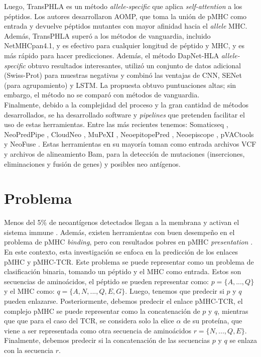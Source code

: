 \documentclass[a4paper]{article}
\begin{document}
Luego, TransPHLA \citep{chu2022transformer} es un método \textit{allele-specific} que aplica \textit{self-attention} a los péptidos. Los autores desarrollaron AOMP, que toma la unión de pMHC como entrada y devuelve péptidos mutantes con mayor afinidad hacia el \textit{allele} MHC. Además, TransPHLA superó a los métodos de vanguardia, incluido NetMHCpan4.1, y es efectivo para cualquier longitud de péptido y MHC, y es más rápido para hacer predicciones. Además, el método DapNet-HLA \textit{allele-specific} \citep{jing2023dapnet} obtuvo resultados interesantes, utilizó un conjunto de datos adicional (Swiss-Prot) para muestras negativas y combinó las ventajas de CNN, SENet (para agrupamiento) y LSTM. La propuesta obtuvo puntuaciones altas; sin embargo, el método no se comparó con métodos de vanguardia.\\


Finalmente, debido a la complejidad del proceso y la gran cantidad de métodos desarrollados, se ha desarrollado software y \textit{pipelines} que pretenden facilitar el uso de estas herramientas. Entre las más recientes tenemos: Somaticseq \citep{fang2015ensemble}, NeoPredPipe \citep{schenck2019neopredpipe}, CloudNeo \citep{bais2017cloudneo}, MuPeXI \citep{bjerregaard2017mupexi}, NeoepitopePred \citep{tran2015immunogenicity}, Neoepiscope \citep{yossef2018enhanced}, pVACtools \citep{hundal2020pvactools}  y NeoFuse \citep{gros2016prospective}. Estas herramientas en su mayoría toman como entrada archivos VCF y archivos de alineamiento Bam, para la detección de mutaciones (inserciones, eliminaciones y fusión de genes) y posibles neo antígenos. 




\section{Problema}

Menos del 5\% de neoantígenos detectados llegan a la membrana y activan el sistema immune \citep{de2020neoantigen, mill2022neoms, bulik2019deep, bassani2015mass, yadav2014predicting}. Además, existen herramientas con buen desempeño en el problema de pMHC \textit{binding}, pero con resultados pobres en  pMHC \textit{presentation} \citep{bulik2019deep}. En este contexto, esta investigación se enfoca en la predicción de  los enlaces pMHC y pMHC-TCR. Este problema se puede representar como un problema de clasificación binaria, tomando un péptido y el MHC como entrada. Estos son secuencias de aminoácidos, el péptido se pueden representar como: $p = \{ A, ... , Q \}$ y el MHC como: $q = \{ A, N, ... ,Q, E, G \}$. Luego, tenemos que  predecir si $p$ y $q$ pueden enlazarse. Posteriormente, debemos predecir el enlace pMHC-TCR, el complejo pMHC se puede representar como la concatenación de $p$ y $q$, mientras que que para el caso del TCR, se considera solo la elice $\alpha$ de su proteína, que viene a ser representada como otra secuencia de aminoácidos $r = \{  N, ... ,Q, E \}$. Finalmente, debemos predecir si la concatenación de las secuencias $p$ y $q$ se enlaza con la secuencia $r$.
\end{document}
